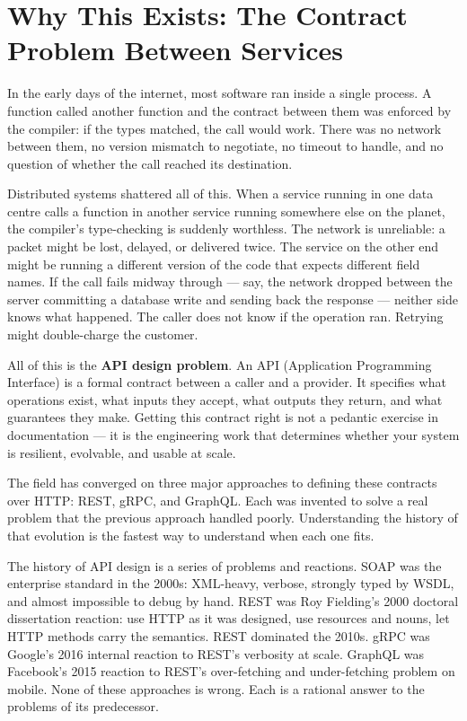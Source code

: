 \documentclass[11pt,a4paper]{article}
\begin{document}
\section{Why This Exists: The Contract Problem Between Services}

In the early days of the internet, most software ran inside a single process. A function called another function and the contract between them was enforced by the compiler: if the types matched, the call would work. There was no network between them, no version mismatch to negotiate, no timeout to handle, and no question of whether the call reached its destination.

Distributed systems shattered all of this. When a service running in one data centre calls a function in another service running somewhere else on the planet, the compiler's type-checking is suddenly worthless. The network is unreliable: a packet might be lost, delayed, or delivered twice. The service on the other end might be running a different version of the code that expects different field names. If the call fails midway through --- say, the network dropped between the server committing a database write and sending back the response --- neither side knows what happened. The caller does not know if the operation ran. Retrying might double-charge the customer.

All of this is the \textbf{API design problem}. An API (Application Programming Interface) is a formal contract between a caller and a provider. It specifies what operations exist, what inputs they accept, what outputs they return, and what guarantees they make. Getting this contract right is not a pedantic exercise in documentation --- it is the engineering work that determines whether your system is resilient, evolvable, and usable at scale.

The field has converged on three major approaches to defining these contracts over HTTP: REST, gRPC, and GraphQL. Each was invented to solve a real problem that the previous approach handled poorly. Understanding the history of that evolution is the fastest way to understand when each one fits.

\begin{insightbox}
The history of API design is a series of problems and reactions. SOAP was the enterprise standard in the 2000s: XML-heavy, verbose, strongly typed by WSDL, and almost impossible to debug by hand. REST was Roy Fielding's 2000 doctoral dissertation reaction: use HTTP as it was designed, use resources and nouns, let HTTP methods carry the semantics. REST dominated the 2010s. gRPC was Google's 2016 internal reaction to REST's verbosity at scale. GraphQL was Facebook's 2015 reaction to REST's over-fetching and under-fetching problem on mobile. None of these approaches is wrong. Each is a rational answer to the problems of its predecessor.
\end{insightbox}
\end{document}
